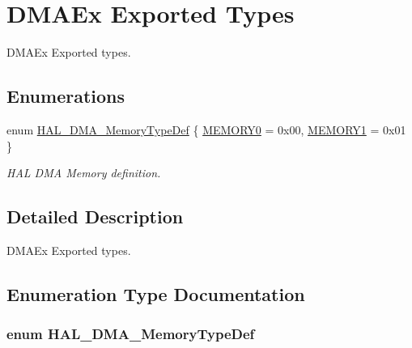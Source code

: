 \hypertarget{group___d_m_a_ex___exported___types}{}\section{D\+M\+A\+Ex Exported Types}
\label{group___d_m_a_ex___exported___types}


D\+M\+A\+Ex Exported types.  


\subsection*{Enumerations}
\begin{DoxyCompactItemize}
\item 
enum \hyperlink{group___d_m_a_ex___exported___types_ga9cec283a461e47eda968838c35fd6eed}{H\+A\+L\+\_\+\+D\+M\+A\+\_\+\+Memory\+Type\+Def} \{ \hyperlink{group___d_m_a_ex___exported___types_gga9cec283a461e47eda968838c35fd6eeda2dec05a318eee29371114f1a8f6fe3f4}{M\+E\+M\+O\+R\+Y0} = 0x00, 
\hyperlink{group___d_m_a_ex___exported___types_gga9cec283a461e47eda968838c35fd6eeda06080dfa68716b5bbf425d9232b144c3}{M\+E\+M\+O\+R\+Y1} = 0x01
 \}\begin{DoxyCompactList}\small\item\em H\+AL D\+MA Memory definition. \end{DoxyCompactList}
\end{DoxyCompactItemize}


\subsection{Detailed Description}
D\+M\+A\+Ex Exported types. 



\subsection{Enumeration Type Documentation}
\subsubsection[{\texorpdfstring{H\+A\+L\+\_\+\+D\+M\+A\+\_\+\+Memory\+Type\+Def}{HAL_DMA_MemoryTypeDef}}]{\setlength{\rightskip}{0pt plus 5cm}enum {\bf H\+A\+L\+\_\+\+D\+M\+A\+\_\+\+Memory\+Type\+Def}}\hypertarget{group___d_m_a_ex___exported___types_ga9cec283a461e47eda968838c35fd6eed}{}\label{group___d_m_a_ex___exported___types_ga9cec283a461e47eda968838c35fd6eed}



